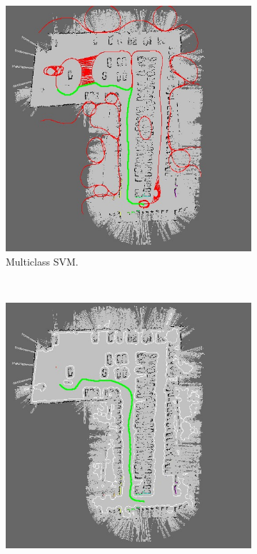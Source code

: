 \begin{figure}[h!]
  \centering
  \begin{subfigure}[b]{0.45\textwidth}
	  \centering
	  \includegraphics[width=\textwidth,height=\textwidth, trim=0 0 0 0,clip]{figure14}
	  \caption{Multiclass \ac{SVM}.}
	  \label{fig:cp06_multi_svm_final}
  \end{subfigure}%
  ~
  \begin{subfigure}[b]{0.45\textwidth}
	  \centering
	  \includegraphics[width=\textwidth,height=\textwidth, trim=0 0 0 0,clip]{figure15}

\end{subfigure}
\end{figure}
